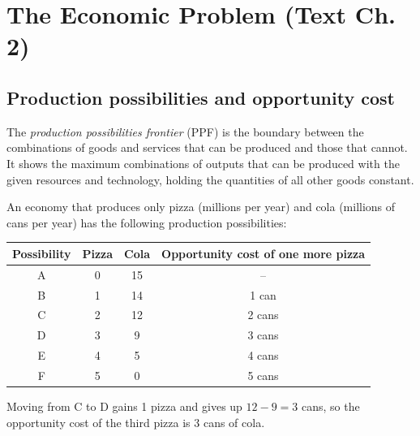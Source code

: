 \chapter{The Economic Problem (Text Ch. 2)}

\section{Production possibilities and opportunity cost}

\begin{definition}
The \emph{production possibilities frontier} (PPF) is the boundary between the
combinations of goods and services that can be produced and those that cannot. It shows
the maximum combinations of outputs that can be produced with the given resources and
technology, holding the quantities of all other goods constant.
\end{definition}

\begin{example}
An economy that produces only pizza (millions per year) and cola (millions of cans per
year) has the following production possibilities:
\begin{center}
\begin{tabular}{cccc}
\toprule
Possibility & Pizza & Cola & Opportunity cost of one more pizza \\
\midrule
A & 0 & 15 & -- \\
B & 1 & 14 & 1 can \\
C & 2 & 12 & 2 cans \\
D & 3 & 9 & 3 cans \\
E & 4 & 5 & 4 cans \\
F & 5 & 0 & 5 cans \\
\bottomrule
\end{tabular}
\end{center}
Moving from C to D gains 1 pizza and gives up $12 - 9 = 3$ cans, so the opportunity
cost of the third pizza is 3 cans of cola.
\end{example}

\begin{center}
\end{center}

